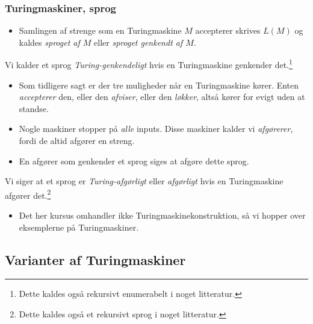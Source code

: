 \begin{frame}[allowframebreaks]
  \frametitle{Turingmaskiner, sprog}

  \begin{itemize}
    \item Samlingen af strenge som en Turingmaskine $M$ accepterer skrives $L(M)$ og kaldes \textit{sproget af $M$} eller \textit{sproget genkendt af $M$}.
  \end{itemize}

  \begin{definition}
Vi kalder et sprog \textit{Turing-genkendeligt} hvis en Turingmaskine genkender det.\footnote{Dette kaldes også rekursivt enumerabelt i noget litteratur.}
  \end{definition}

  \begin{itemize}
    \item Som tidligere sagt er der tre muligheder når en Turingmaskine kører. Enten \textit{accepterer} den, eller den \textit{afviser}, eller den \textit{løkker}, altså kører for evigt uden at standse.
    \item Nogle maskiner stopper på \textit{alle} inputs. Disse maskiner kalder vi \textit{afgørerer}, fordi de altid afgører en streng.
    \item En afgører som genkender et sprog siges at afgøre dette sprog.
  \end{itemize}

  \begin{definition}
Vi siger at et sprog er \textit{Turing-afgørligt} eller \textit{afgørligt} hvis en Turingmaskine afgører det.\footnote{Dette kaldes også et rekursivt sprog i noget litteratur.}
  \end{definition}

  \begin{itemize}
\item Det her kursus omhandler ikke Turingmaskinekonstruktion, så vi hopper over eksemplerne på Turingmaskiner.
  \end{itemize}
\end{frame}

\subsection{Varianter af Turingmaskiner}%
\label{subsec:label}

